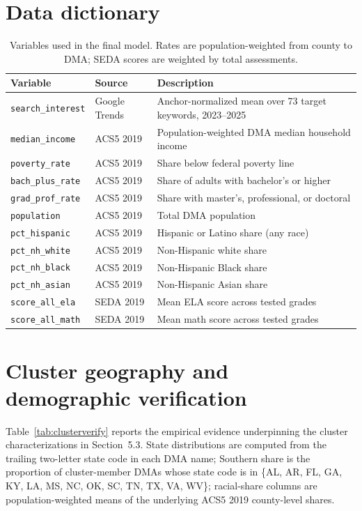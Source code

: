 \documentclass[11pt]{article}
\begin{document}
\section{Data dictionary}
\label{sec:appdata}

\begin{table}[!htbp]
\centering
\small
\begin{tabular}{lll}
\toprule
Variable & Source & Description \\
\midrule
\texttt{search\_interest}    & Google Trends & Anchor-normalized mean over 73 target keywords, 2023--2025 \\
\texttt{median\_income}      & ACS5 2019    & Population-weighted DMA median household income \\
\texttt{poverty\_rate}       & ACS5 2019    & Share below federal poverty line \\
\texttt{bach\_plus\_rate}    & ACS5 2019    & Share of adults with bachelor's or higher \\
\texttt{grad\_prof\_rate}    & ACS5 2019    & Share with master's, professional, or doctoral \\
\texttt{population}          & ACS5 2019    & Total DMA population \\
\texttt{pct\_hispanic}       & ACS5 2019    & Hispanic or Latino share (any race) \\
\texttt{pct\_nh\_white}      & ACS5 2019    & Non-Hispanic white share \\
\texttt{pct\_nh\_black}      & ACS5 2019    & Non-Hispanic Black share \\
\texttt{pct\_nh\_asian}      & ACS5 2019    & Non-Hispanic Asian share \\
\texttt{score\_all\_ela}     & SEDA 2019    & Mean ELA score across tested grades \\
\texttt{score\_all\_math}    & SEDA 2019    & Mean math score across tested grades \\
\bottomrule
\end{tabular}
\caption{Variables used in the final model. Rates are population-weighted from county to DMA; SEDA scores are weighted by total assessments.}
\label{tab:vars}
\end{table}

\section{Cluster geography and demographic verification}
\label{sec:appclusters}

Table~\ref{tab:clusterverify} reports the empirical evidence underpinning the cluster characterizations in Section~5.3. State distributions are computed from the trailing two-letter state code in each DMA name; Southern share is the proportion of cluster-member DMAs whose state code is in \{AL, AR, FL, GA, KY, LA, MS, NC, OK, SC, TN, TX, VA, WV\}; racial-share columns are population-weighted means of the underlying ACS5 2019 county-level shares.
\end{document}
